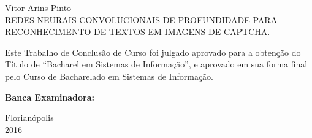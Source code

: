 \begin{folhadeaprovacao}
  \begin{center}
    \large
    Vitor Arins Pinto\\[2cm]
    REDES NEURAIS CONVOLUCIONAIS DE PROFUNDIDADE PARA RECONHECIMENTO
    DE TEXTOS EM IMAGENS DE CAPTCHA.\\[2cm]
    \begin{espacosimples}
      Este Trabalho de Conclusão de Curso foi julgado aprovado para a
      obtenção do Título de “Bacharel em Sistemas de Informação”, e
      aprovado em sua forma final pelo Curso de Bacharelado em Sistemas de
      Informação.
    \end{espacosimples}
  \end{center}
  {\bf Banca Examinadora:}
  \begin{flushright} 
  \end{flushright}
  \begin{center}
    \vfill
    Florianópolis\\
    2016
  \end{center}
  \clearpage
\end{folhadeaprovacao}
